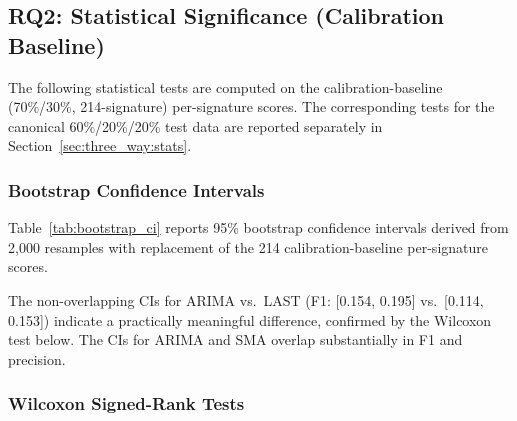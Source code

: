 \documentclass[a4paper,fleqn]{cas-sc}
\theoremstyle{plain}
\begin{document}
\subsection{RQ2: Statistical Significance (Calibration Baseline)}\label{sec:largescale:RQ2}

The following statistical tests are computed on the calibration-baseline
(70\%/30\%, 214-signature) per-signature scores.
The corresponding tests for the canonical 60\%/20\%/20\% test data are
reported separately in Section~\ref{sec:three_way:stats}.

\subsubsection{Bootstrap Confidence Intervals}

Table~\ref{tab:bootstrap_ci} reports 95\% bootstrap confidence intervals
derived from 2,000 resamples with replacement of the 214 calibration-baseline
per-signature scores.

\begin{table}[tbp]
\centering
{}
\caption{Bootstrap 95\% confidence intervals (2,000 resamples) on the
  calibration-baseline (214-signature, 70\%/30\%) per-signature scores.}
\label{tab:bootstrap_ci}
\end{table}

The non-overlapping CIs for ARIMA vs.\ LAST (F1: [0.154, 0.195]
vs.\ [0.114, 0.153]) indicate a practically meaningful difference, confirmed
by the Wilcoxon test below.
The CIs for ARIMA and SMA overlap substantially in F1 and precision.

\subsubsection{Wilcoxon Signed-Rank Tests}
\end{document}
